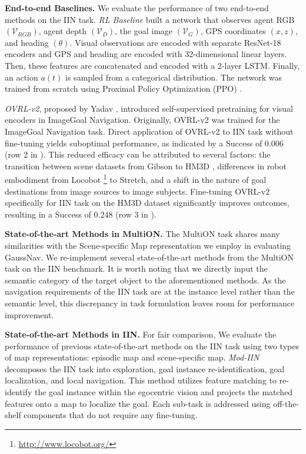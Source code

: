 \textbf{End-to-end Baselines.} We evaluate the performance of two end-to-end methods on the IIN task. \textit{RL Baseline} built a network that observes agent RGB $(\mathcal{V}_{RGB})$, agent depth $(\mathcal{V}_{D})$, the goal image $(\mathcal{V}_G)$, GPS coordinates $(x,z)$, and heading $(\theta)$. Visual observations are encoded with separate ResNet-18~\cite{he2016deep} encoders and GPS and heading are encoded with 32-dimensional linear layers. Then, these features are concatenated and encoded with a 2-layer LSTM. Finally, an action $a(t)$ is sampled from a categorical distribution. The network was trained from scratch using Proximal Policy Optimization (PPO) \cite{schulman2017proximal}.

\textit{OVRL-v2}, proposed by Yadav \etal \cite{yadav2023ovrl}, introduced self-supervised pretraining for visual encoders in ImageGoal Navigation. Originally, OVRL-v2 was trained for the ImageGoal Navigation task. Direct application of OVRL-v2 to IIN task without fine-tuning yields suboptimal performance, as indicated by a Success of 0.006 (row 2 in ). This reduced efficacy can be attributed to several factors: the transition between scene datasets from Gibson \cite{xia2018gibson} to HM3D \cite{yadav2023habitat}, differences in robot embodiment from Locobot \footnote{\url{http://www.locobot.org/}} to Stretch, and a shift in the nature of goal destinations from image sources to image subjects. Fine-tuning OVRL-v2 specifically for IIN task on the HM3D dataset significantly improves outcomes, resulting in a Success of 0.248 (row 3 in ).


\textbf{State-of-the-art Methods in MultiON.} The MultiON task shares many similarities with the Scene-specific Map representation we employ in evaluating GaussNav. We re-implement several state-of-the-art methods \cite{wani2020multion, chen2022learning, marza2023multi} from the MultiON task on the IIN benchmark. It is worth noting that we directly input the semantic category of the target object to the aforementioned methods. As the navigation requirements of the IIN task are at the instance level rather than the semantic level, this discrepancy in task formulation leaves room for performance improvement.





\textbf{State-of-the-art Methods in IIN.} For fair comparison, We evaluate the performance of previous state-of-the-art methods \cite{krantz2023navigating, lei2024instanceaware} on the IIN task using two types of map representations: episodic map and scene-specific map. \textit{Mod-IIN} \cite{krantz2023navigating} decomposes the IIN task into exploration, goal instance re-identification, goal localization, and local navigation. This method utilizes feature matching to re-identify the goal instance within the egocentric vision and projects the matched features onto a map to localize the goal. Each sub-task is addressed using off-the-shelf components that do not require any fine-tuning.

